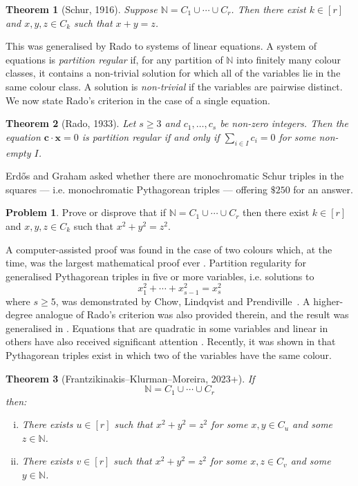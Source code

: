 \documentclass[12pt, reqno]{amsart}
\newtheorem{thm}{Theorem}[section]
\theoremstyle{definition}
\theoremstyle{remark}
\numberwithin{equation}{section}
\theoremstyle{definition}
\newtheorem{prob}{Problem}
\def \bN {\mathbb N}
\def \bc {\mathbf c}
\def \bx {\mathbf x}
\begin{document}
\begin{thm} [Schur, 1916]
\label{thm1.1}
Suppose $\bN = C_1 \cup \cdots \cup C_r$. Then there exist $k \in [r]$ and $x, y, z \in C_k$ such that $x + y = z$.
\end{thm}

This was generalised by Rado \cite{Rad1933} to systems of linear equations. A system of equations is \emph{partition regular} if, for any partition of $\bN$ into finitely many colour classes, it contains a non-trivial solution for which all of the variables lie in the same colour class. A solution is \emph{non-trivial} if the variables are pairwise distinct. We now state Rado's criterion in the case of a single equation.

\begin{thm}
[Rado, 1933]
Let $s \ge 3$ and $c_1, \ldots, c_s$ be non-zero integers. Then the equation $\bc \cdot \bx = 0$ is partition regular if and only if $\sum_{i \in I} c_i = 0$ for some non-empty $I$.
\end{thm}

Erd\H{o}s and Graham \cite{Gra2007, Gra2008} asked whether there are monochromatic Schur triples in the squares --- i.e. monochromatic Pythagorean triples --- offering $\$250$ for an answer.

\begin{prob}
\label{probA}
Prove or disprove that if $\bN = C_1 \cup \cdots \cup C_r$ then there exist $k \in [r]$ and $x, y, z \in C_k$ such that $x^2 + y^2 = z^2$.
\end{prob}

A computer-assisted proof was found in the case of two colours \cite{HKM2016} which, at the time, was the largest mathematical proof ever \cite{Lam2016}. Partition regularity for generalised Pythagorean triples in five or more variables, i.e. solutions to
\[
x_1^2 + \cdots + x_{s-1}^2 = x_s^2
\]
where $s \ge 5$, was demonstrated by Chow, Lindqvist and Prendiville~\cite{CLP2021}. A higher-degree analogue of Rado's criterion was also provided therein, and the result was generalised in \cite{Cha2022, CC1, CC2}. Equations that are quadratic in some variables and linear in others have also received significant attention \cite{GL2019, Mor2017, Pac2018, Pre2021}.
Recently, it was shown in \cite{FKM} that Pythagorean triples exist in which two of the variables have the same colour.

\begin{thm} [Frantzikinakis--Klurman--Moreira, 2023+]
If 
\[
\bN = C_1 \cup \cdots \cup C_r
\]
then:
\begin{enumerate} [(i)]
\item There exists $u \in [r]$ such that $x^2 + y^2 = z^2$ for some $x,y \in C_u$ and some $z \in \bN$.
\item There exists $v \in [r]$ such that $x^2 + y^2 = z^2$ for some $x,z \in C_v$ and some $y \in \bN$.
\end{enumerate}
\end{thm}
\end{document}
